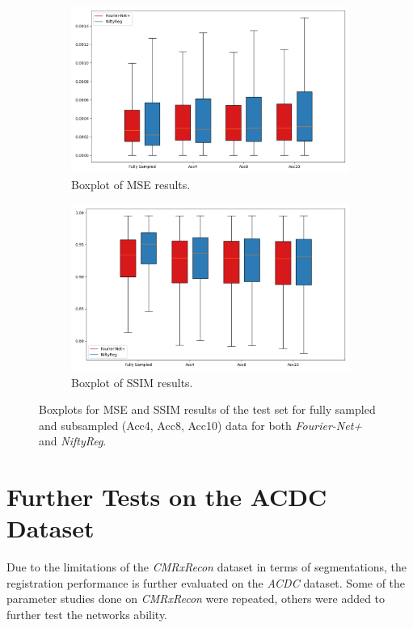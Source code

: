 \documentclass[english,version-2022-01]{uzl-thesis} %
\begin{document}
\begin{figure}[h] %
	\centering
	\graphicspath{{images/}{\main/images/}}
	\begin{subfigure}{0.495\textwidth}
    		\includegraphics[width=\textwidth]{TestBenchmark_MSE_Boxplots.png}
    		\caption{Boxplot of MSE results.}
    		\label{fig:TestBenchmark_MSE_Boxplots}
	\end{subfigure}
	\hfill
	\begin{subfigure}{0.495\textwidth}
    		\includegraphics[width=\textwidth]{TestBenchmark_SSIM_Boxplots.png}
    		\caption{Boxplot of SSIM results.}
    		\label{fig:TestBenchmark_SSIM_Boxplots}
	\end{subfigure}
	\caption{Boxplots for MSE and SSIM results of the test set for fully sampled and subsampled (Acc4, Acc8, Acc10) data for both \emph{Fourier-Net+} and \emph{NiftyReg}.}
	\label{fig:TestBenchmark_Boxplots}
\end{figure}

\section{Further Tests on the ACDC Dataset}
Due to the limitations of the \emph{CMRxRecon} dataset in terms of segmentations, the registration performance is further evaluated on the \emph{ACDC} dataset. Some of the parameter studies done on \emph{CMRxRecon} were repeated, others were added to further test the networks ability.
\end{document}
